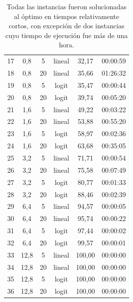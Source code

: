 \documentclass{article}
\begin{document}
\begin{table}
\begin{tabular}{cccccc}
        17 & 0,8 & 5 & lineal & 32,17 & 00:00:59 \\
        18 & 0,8 & 20 & lineal & 35,66 & 01:26:32 \\
        19 & 0,8 & 5 & logit & 35,47 & 00:00:44 \\
        20 & 0,8 & 20 & logit & 39,74 & 00:05:20 \\
        21 & 1,6 & 5 & lineal & 49,22 & 00:03:22 \\
        22 & 1,6 & 20 & lineal & 53,88 & 00:55:20 \\
        23 & 1,6 & 5 & logit & 58,97 & 00:02:36 \\
        24 & 1,6 & 20 & logit & 63,68 & 00:35:05 \\
        25 & 3,2 & 5 & lineal & 71,71 & 00:00:54 \\
        26 & 3,2 & 20 & lineal & 75,58 & 00:07:49 \\
        27 & 3,2 & 5 & logit & 80,77 & 00:01:33 \\
        28 & 3,2 & 20 & logit & 88,46 & 00:02:39 \\
        29 & 6,4 & 5 & lineal & 94,57 & 00:00:05 \\
        30 & 6,4 & 20 & lineal & 95,74 & 00:00:22 \\
        31 & 6,4 & 5 & logit & 97,44 & 00:00:02 \\
        32 & 6,4 & 20 & logit & 99,57 & 00:00:01 \\
        33 & 12,8 & 5 & lineal & 100,00 & 00:00:00 \\
        34 & 12,8 & 20 & lineal & 100,00 & 00:00:00 \\
        35 & 12,8 & 5 & logit & 100,00 & 00:00:00 \\
        36 & 12,8 & 20 & logit & 100,00 & 00:00:00 \\
        \bottomrule
    \end{tabular}
    \caption{Todas las instancias fueron solucionadas al óptimo en tiempos relativamente cortos, con excepción de dos instancias cuyo tiempo de ejecución fue más de una hora.} \label{table:sensibilityresults}
  \end{table}
\end{document}

